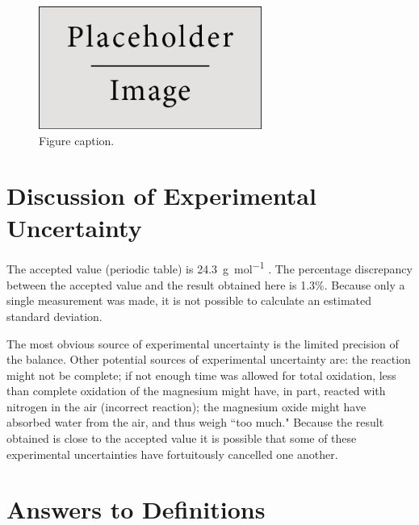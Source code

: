 \documentclass{article}
\begin{document}
\begin{figure}[h]
\begin{center}
\includegraphics[width=0.65\textwidth]{placeholder} %
\caption{Figure caption.}
\end{center}
\end{figure}


\section{Discussion of Experimental Uncertainty}

The accepted value (periodic table) is \SI{24.3}{\gram\per\mole} \cite{Smith:2012qr}. The percentage discrepancy between the accepted value and the result obtained here is 1.3\%. Because only a single measurement was made, it is not possible to calculate an estimated standard deviation.

The most obvious source of experimental uncertainty is the limited precision of the balance. Other potential sources of experimental uncertainty are: the reaction might not be complete; if not enough time was allowed for total oxidation, less than complete oxidation of the magnesium might have, in part, reacted with nitrogen in the air (incorrect reaction); the magnesium oxide might have absorbed water from the air, and thus weigh ``too much." Because the result obtained is close to the accepted value it is possible that some of these experimental uncertainties have fortuitously cancelled one another.


\section{Answers to Definitions}
\end{document}
